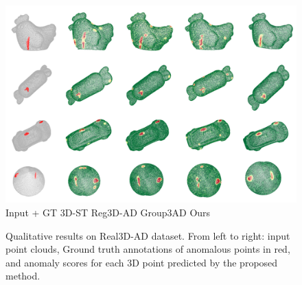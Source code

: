 \begin{figure}[!ht]
    \includegraphics[width=\linewidth]{figs/real3d}
    Input + GT \hspace{1.2cm} 3D-ST \cite{bergmann2023anomaly} \hspace{1.3cm} Reg3D-AD \cite{liu2023real3d} \hspace{1.3cm} Group3AD   \cite{zhu2024towards} \hspace{1.7cm} Ours \hspace{1.5cm}
    \caption{Qualitative results on Real3D-AD dataset. From left to right: input point clouds, Ground truth annotations of anomalous points in red, and anomaly scores for each 3D point predicted by the proposed method.}
    \label{fig:real3d}
\end{figure}


